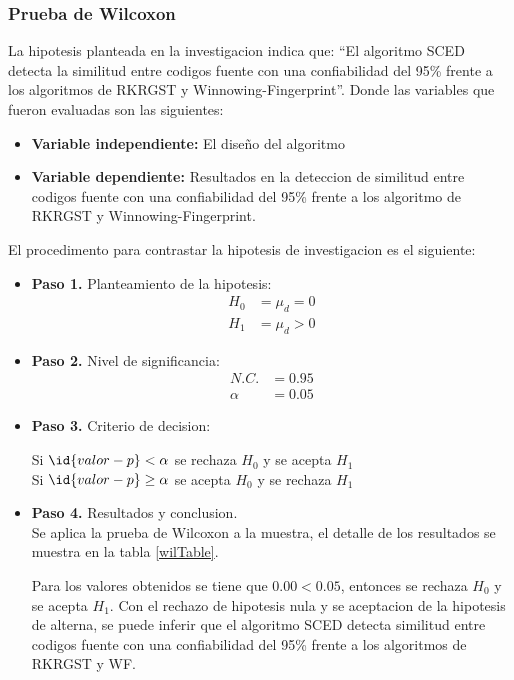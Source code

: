 \subsubsection{Prueba de Wilcoxon}
La hipotesis planteada en la investigacion indica que: ``El algoritmo SCED detecta la similitud entre codigos fuente con una confiabilidad del 95\% frente a los algoritmos de RKRGST y Winnowing-Fingerprint''. Donde las variables que fueron evaluadas son las siguientes:
\begin{itemize}
  \item[] \textbf{Variable independiente:} El diseño del algoritmo 
  \item[] \textbf{Variable dependiente:} Resultados en la deteccion de similitud entre codigos fuente con una confiabilidad del 95\% frente a los algoritmo de RKRGST y Winnowing-Fingerprint.
\end{itemize}

El procedimento para contrastar la hipotesis de investigacion es el siguiente:
\begin{itemize}
  \item[] \textbf{Paso 1.} Planteamiento de la hipotesis:
  \begin{equation*}
  \begin{split}
  H_0 & = \mu_d = 0 \\
  H_1 & = \mu_d > 0
  \end{split}
  \end{equation*}
  \item[] \textbf{Paso 2.} Nivel de significancia:
  \begin{equation*}
  \begin{split}
  N.C. & = 0.95 \\
  \alpha & = 0.05
  \end{split}
  \end{equation*}
  \item[] \textbf{Paso 3.} Criterio de decision:
  \begin{center}
  Si $\id{valor-p} < \alpha$ se rechaza $H_0$ y se acepta $H_1$\\
  Si $\id{valor-p} \geq \alpha$ se acepta $H_0$ y se rechaza $H_1$
  \end{center}
  \item[] \textbf{Paso 4.} Resultados y conclusion.\\
  Se aplica la prueba de Wilcoxon a la muestra, el detalle de los resultados se muestra en la tabla \ref{wilTable}.
  
  
  Para los valores obtenidos se tiene que $0.00 < 0.05$, entonces se rechaza $H_0$ y se acepta $H_1$. Con el rechazo de hipotesis nula y se aceptacion de la hipotesis de alterna, se puede inferir que el algoritmo SCED detecta similitud entre codigos fuente con una confiabilidad del 95\% frente a los algoritmos de RKRGST y WF.
\end{itemize}
